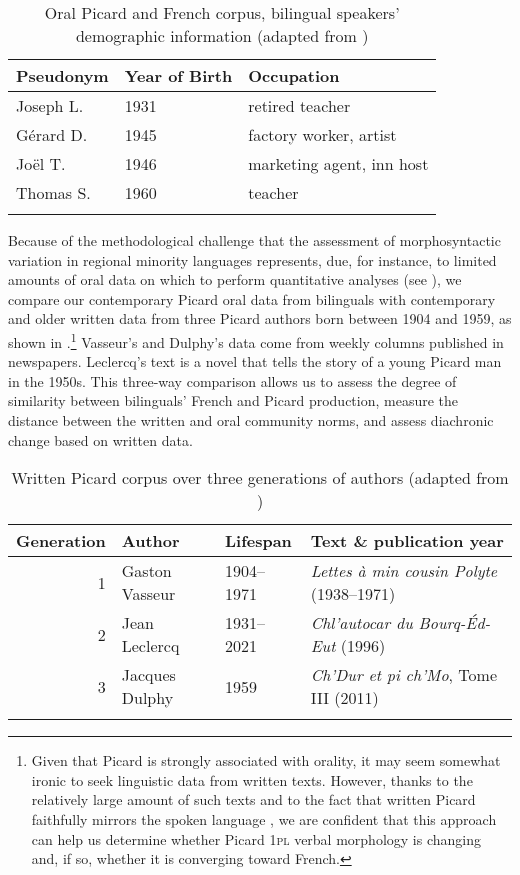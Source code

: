 \documentclass[output=paper,colorlinks,citecolor=brown]{langscibook}
\begin{document}
\begin{table}
\caption{Oral Picard and French corpus, bilingual speakers’ demographic information (adapted from \citealt[119]{villeneuve_chtileu_2013})}
\label{02:table2}
 \begin{tabularx}{\linewidth}{ X X l }
 \lsptoprule
\textbf{Pseudonym} & \textbf{Year of Birth} & \textbf{Occupation} \\
\midrule
Joseph L.   &   1931    &   retired teacher \\
Gérard D. &   1945    &   factory worker, artist\\
Joël T.   &   1946    &   marketing agent, inn host\\
Thomas S.   &   1960    &   teacher \\
\lspbottomrule
\end{tabularx}
\end{table}


Because of the methodological challenge that the assessment of morphosyntactic variation in regional minority languages represents, due, for instance, to limited amounts of oral data on which to perform quantitative analyses (see \citealt[552]{auger_using_2017}), we compare our contemporary Picard oral data from bilinguals with contemporary and older written data from three Picard authors born between 1904 and 1959, as shown in .\footnote{Given that Picard is strongly associated with orality, it may seem somewhat ironic to seek linguistic data from written texts. However, thanks to the relatively large amount of such texts and to the fact that written Picard faithfully mirrors the spoken language \citep{auger_picard_2002, auger_picard_2003}, we are confident that this approach can help us determine whether Picard 1\textsc{pl} verbal morphology is changing and, if so, whether it is converging toward French.} Vasseur’s and Dulphy’s data come from weekly columns published in newspapers. Leclercq’s text is a novel that tells the story of a young Picard man in the 1950s. This three-way comparison allows us to assess the degree of similarity between bilinguals’ French and Picard production, measure the distance between the written and oral community norms, and assess diachronic change based on written data.

\begin{table}
\caption{Written Picard corpus over three generations of authors (adapted from \citealt[218]{auger_building_2019})}
\label{02:table3}
 \begin{tabularx}{\linewidth}{ r l l X }
 \lsptoprule
\textbf{Generation} & \textbf{Author} & \textbf{Lifespan}&\textbf{Text \& publication year} \\
\midrule
1   &   Gaston Vasseur  &   1904--1971   &   \textit{Lettes à min cousin Polyte} (1938--1971) \\
2   &   Jean Leclercq   &   1931--2021   &   \textit{Chl’autocar du Bourq-Éd-Eut} (1996) \\
3   &   Jacques Dulphy  &   1959        &   \textit{Ch’Dur et pi ch’Mo}, Tome III (2011)\\
\lspbottomrule
\end{tabularx}
\end{table}
\end{document}
